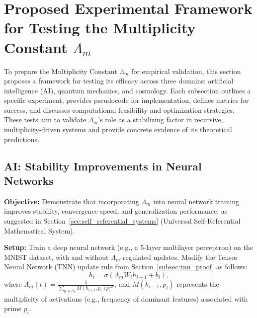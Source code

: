 \documentclass{article}
\theoremstyle{plain}
\begin{document}
\section{Proposed Experimental Framework for Testing the Multiplicity Constant \(\Lambda_m\)}
\label{sec:experimental_framework}

To prepare the Multiplicity Constant \(\Lambda_m\) for empirical validation, this section proposes a framework for testing its efficacy across three domains: artificial intelligence (AI), quantum mechanics, and cosmology. Each subsection outlines a specific experiment, provides pseudocode for implementation, defines metrics for success, and discusses computational feasibility and optimization strategies. These tests aim to validate \(\Lambda_m\)'s role as a stabilizing factor in recursive, multiplicity-driven systems and provide concrete evidence of its theoretical predictions.

\subsection{AI: Stability Improvements in Neural Networks}
\label{subsec:ai_test}

\textbf{Objective:} Demonstrate that incorporating \(\Lambda_m\) into neural network training improves stability, convergence speed, and generalization performance, as suggested in Section~\ref{sec:self_referential_systems} (Universal Self-Referential Mathematical System).

\textbf{Setup:} Train a deep neural network (e.g., a 5-layer multilayer perceptron) on the MNIST dataset, with and without \(\Lambda_m\)-regulated updates. Modify the Tensor Neural Network (TNN) update rule from Section~\ref{subsec:tnn_proof} as follows:
\[
h_i = \sigma\left(\Lambda_m W_i h_{i-1} + b_i\right),
\]
where \(\Lambda_m(t) = \frac{1}{\sum_{p_i \in P_N} M(h_{i-1}, p_i) p_i^{-\alpha}}\), and \(M(h_{i-1}, p_i)\) represents the multiplicity of activations (e.g., frequency of dominant features) associated with prime \(p_i\).
\end{document}
